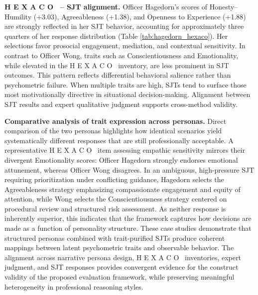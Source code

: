 \documentclass[11pt]{article}
\newcommand{\hexaco}{%
  {\textcolor{hexH}{H}}%
  {\textcolor{hexE}{E}}%
  {\textcolor{hexX}{X}}%
  {\textcolor{hexA}{A}}%
  {\textcolor{hexC}{C}}%
  {\textcolor{hexO}{O}}%
}
\begin{document}
\noindent \textbf{\hexaco\ – SJT alignment.} Officer Hagedorn’s scores of \textcolor{hexH}{Honesty--Humility} (+3.03), \textcolor{hexA}{Agreeableness} (+1.38), and \textcolor{hexO}{Openness to Experience} (+1.88) are strongly reflected in her SJT behavior, accounting for approximately three quarters of her response distribution (Table \ref{tab:hagedorn_hexaco}). Her selections favor prosocial engagement, mediation, and contextual sensitivity. In contrast to Officer Wong, traits such as \textcolor{hexC}{Conscientiousness} and \textcolor{hexE}{Emotionality}, while elevated in the \hexaco\ inventory, are less prominent in SJT outcomes. This pattern reflects differential behavioral salience rather than psychometric failure. When multiple traits are high, SJTs tend to surface those most motivationally directive in situational decision-making. Alignment between SJT results and expert qualitative judgment supports cross-method validity.
  
\noindent \textbf{Comparative analysis of trait expression across personas.}
Direct comparison of the two personas highlights how identical scenarios yield systematically different responses that are still professionally acceptable. A representative \hexaco\ item assessing empathic sensitivity mirrors their divergent \textcolor{hexE}{Emotionality} scores: Officer Hagedorn strongly endorses emotional attunement, whereas Officer Wong disagrees. In an ambiguous, high-pressure SJT requiring prioritization under conflicting guidance, Hagedorn selects the \textcolor{hexA}{Agreeableness} strategy emphasizing compassionate engagement and equity of attention, while Wong selects the \textcolor{hexC}{Conscientiousness} strategy centered on procedural review and structured risk assessment. As neither response is inherently superior, this indicates that the framework captures how decisions are made as a function of personality structure.
These case studies demonstrate that structured personas combined with trait-purified SJTs produce coherent mappings between latent psychometric traits and observable behavior. The alignment across narrative persona design, \hexaco\ inventories, expert judgment, and SJT responses provides convergent evidence for the construct validity of the proposed evaluation framework, while preserving meaningful heterogeneity in professional reasoning styles.
\end{document}
